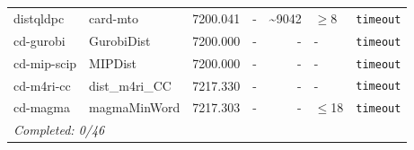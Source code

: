 \begin{longtable}{llrrrl p{}}
distqldpc & card-mto & 7200.041 & - & \textasciitilde{}9042 & $\geq$8 & \texttt{timeout} \\
cd-gurobi & GurobiDist & 7200.000 & - & - & - & \texttt{timeout} \\
cd-mip-scip & MIPDist & 7200.000 & - & - & - & \texttt{timeout} \\
cd-m4ri-cc & dist\_m4ri\_CC & 7217.330 & - & - & - & \texttt{timeout} \\
cd-magma & magmaMinWord & 7217.303 & - & - & $\leq$18 & \texttt{timeout} \\
\midrule
\multicolumn{7}{l}{\textit{Completed: 0/46}} \\
\end{longtable}
